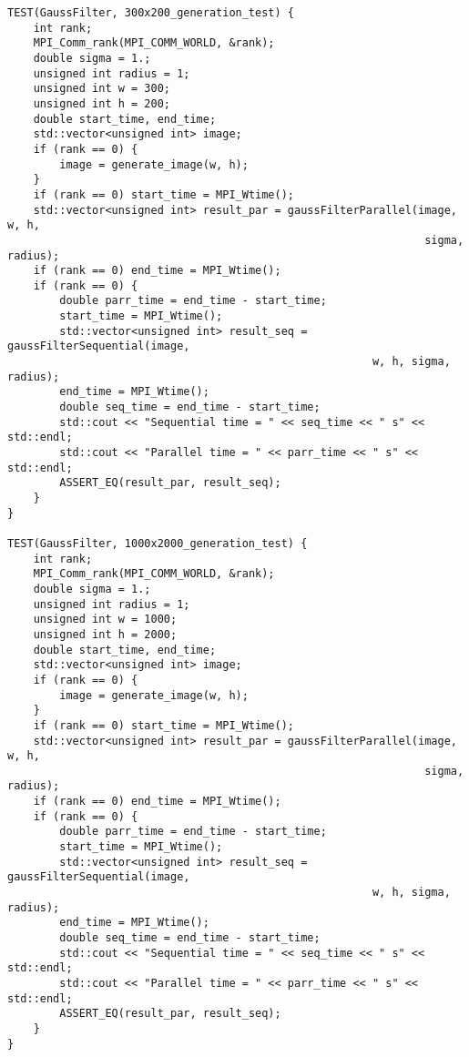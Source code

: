 \documentclass{report}
\begin{document}
\begin{lstlisting}
TEST(GaussFilter, 300x200_generation_test) {
    int rank;
    MPI_Comm_rank(MPI_COMM_WORLD, &rank);
    double sigma = 1.;
    unsigned int radius = 1;
    unsigned int w = 300;
    unsigned int h = 200;
    double start_time, end_time;
    std::vector<unsigned int> image;
    if (rank == 0) {
        image = generate_image(w, h);
    }
    if (rank == 0) start_time = MPI_Wtime();
    std::vector<unsigned int> result_par = gaussFilterParallel(image, w, h,
                                                                sigma, radius);
    if (rank == 0) end_time = MPI_Wtime();
    if (rank == 0) {
        double parr_time = end_time - start_time;
        start_time = MPI_Wtime();
        std::vector<unsigned int> result_seq = gaussFilterSequential(image,
                                                        w, h, sigma, radius);
        end_time = MPI_Wtime();
        double seq_time = end_time - start_time;
        std::cout << "Sequential time = " << seq_time << " s" << std::endl;
        std::cout << "Parallel time = " << parr_time << " s" << std::endl;
        ASSERT_EQ(result_par, result_seq);
    }
}

TEST(GaussFilter, 1000x2000_generation_test) {
    int rank;
    MPI_Comm_rank(MPI_COMM_WORLD, &rank);
    double sigma = 1.;
    unsigned int radius = 1;
    unsigned int w = 1000;
    unsigned int h = 2000;
    double start_time, end_time;
    std::vector<unsigned int> image;
    if (rank == 0) {
        image = generate_image(w, h);
    }
    if (rank == 0) start_time = MPI_Wtime();
    std::vector<unsigned int> result_par = gaussFilterParallel(image, w, h,
                                                                sigma, radius);
    if (rank == 0) end_time = MPI_Wtime();
    if (rank == 0) {
        double parr_time = end_time - start_time;
        start_time = MPI_Wtime();
        std::vector<unsigned int> result_seq = gaussFilterSequential(image,
                                                        w, h, sigma, radius);
        end_time = MPI_Wtime();
        double seq_time = end_time - start_time;
        std::cout << "Sequential time = " << seq_time << " s" << std::endl;
        std::cout << "Parallel time = " << parr_time << " s" << std::endl;
        ASSERT_EQ(result_par, result_seq);
    }
}


\end{lstlisting}
\end{document}
